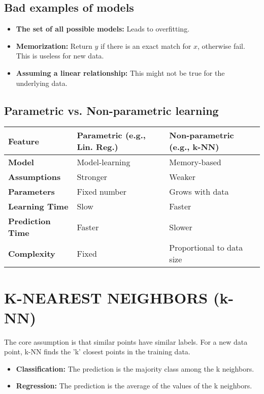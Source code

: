 \documentclass{article}
\begin{document}
\begin{multicols}{2}
\subsection{Bad examples of models}
\begin{itemize}
    \item \textbf{The set of all possible models:} Leads to overfitting. 
    \item \textbf{Memorization:} Return $y$ if there is an exact match for $x$, otherwise fail. This is useless for new data. 
    \item \textbf{Assuming a linear relationship:} This might not be true for the underlying data. 
\end{itemize}

\subsection{Parametric vs. Non-parametric learning}
\begin{table}[h!]
\centering
\begin{tabular}{|l|l|l|}
\hline
\textbf{Feature} & \textbf{Parametric (e.g., Lin. Reg.)} & \textbf{Non-parametric (e.g., k-NN)} \\
\hline
\textbf{Model} & Model-learning & Memory-based  \\
\textbf{Assumptions} & Stronger & Weaker  \\
\textbf{Parameters} & Fixed number & Grows with data  \\
\textbf{Learning Time} & Slow & Faster  \\
\textbf{Prediction Time} & Faster & Slower  \\
\textbf{Complexity} & Fixed & Proportional to data size  \\
\hline
\end{tabular}
\end{table}

\section{K-NEAREST NEIGHBORS (k-NN)}
The core assumption is that similar points have similar labels.  For a new data point, k-NN finds the 'k' closest points in the training data.

\begin{itemize}
    \item \textbf{Classification:} The prediction is the majority class among the k neighbors. 
    \item \textbf{Regression:} The prediction is the average of the values of the k neighbors. 
\end{itemize}


\end{multicols}
\end{document}
